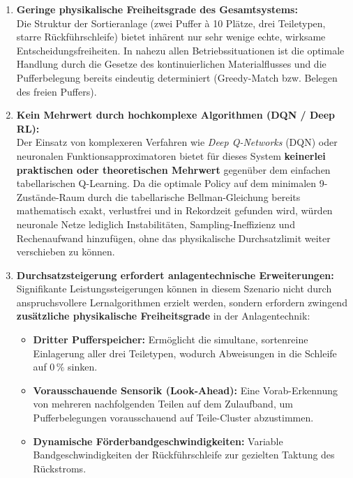 \documentclass[11pt,a4paper]{article}
\begin{document}
\begin{enumerate}
  \item \textbf{Geringe physikalische Freiheitsgrade des Gesamtsystems:} \\
  Die Struktur der Sortieranlage (zwei Puffer à 10 Plätze, drei Teiletypen, starre Rückführschleife) bietet inhärent nur sehr wenige echte, wirksame Entscheidungsfreiheiten. In nahezu allen Betriebssituationen ist die optimale Handlung durch die Gesetze des kontinuierlichen Materialflusses und die Pufferbelegung bereits eindeutig determiniert (Greedy-Match bzw. Belegen des freien Puffers).
  
  \item \textbf{Kein Mehrwert durch hochkomplexe Algorithmen (DQN / Deep RL):} \\
  Der Einsatz von komplexeren Verfahren wie \textit{Deep Q-Networks} (DQN) oder neuronalen Funktionsapproximatoren bietet für dieses System \textbf{keinerlei praktischen oder theoretischen Mehrwert} gegenüber dem einfachen tabellarischen Q-Learning. Da die optimale Policy auf dem minimalen 9-Zustände-Raum durch die tabellarische Bellman-Gleichung bereits mathematisch exakt, verlustfrei und in Rekordzeit gefunden wird, würden neuronale Netze lediglich Instabilitäten, Sampling-Ineffizienz und Rechenaufwand hinzufügen, ohne das physikalische Durchsatzlimit weiter verschieben zu können.

  \item \textbf{Durchsatzsteigerung erfordert anlagentechnische Erweiterungen:} \\
  Signifikante Leistungssteigerungen können in diesem Szenario nicht durch anspruchsvollere Lernalgorithmen erzielt werden, sondern erfordern zwingend \textbf{zusätzliche physikalische Freiheitsgrade} in der Anlagentechnik:
  \begin{itemize}
    \item \textbf{Dritter Pufferspeicher:} Ermöglicht die simultane, sortenreine Einlagerung aller drei Teiletypen, wodurch Abweisungen in die Schleife auf $0\,\%$ sinken.
    \item \textbf{Vorausschauende Sensorik (Look-Ahead):} Eine Vorab-Erkennung von mehreren nachfolgenden Teilen auf dem Zulaufband, um Pufferbelegungen vorausschauend auf Teile-Cluster abzustimmen.
    \item \textbf{Dynamische Förderbandgeschwindigkeiten:} Variable Bandgeschwindigkeiten der Rückführschleife zur gezielten Taktung des Rückstroms.
  \end{itemize}
\end{enumerate}
\end{document}

